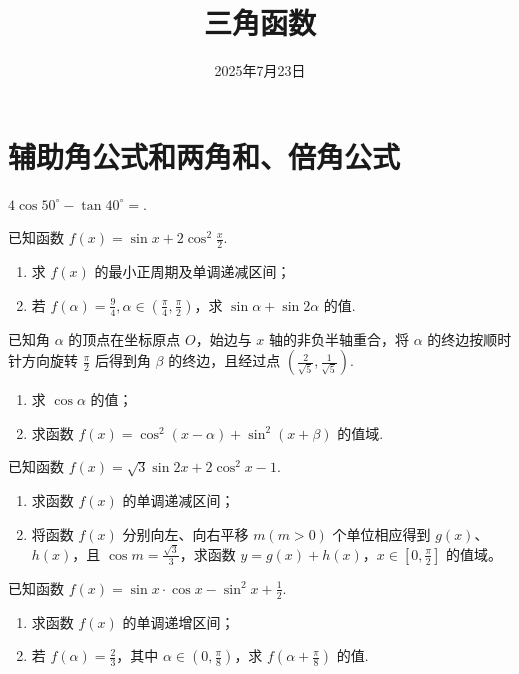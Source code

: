 \documentclass[a4paper , final]{ctexart}
\title{三角函数}
\date{2025年7月23日}
\newenvironment{problem}[1]{%
  \item #1
  \par
  \vspace{8cm}
}{}
\begin{document}
\maketitle

\section*{辅助角公式和两角和、倍角公式}

\begin{problems}
  \begin{problem}
  {
  $4\cos{50^\circ}-\tan{40^\circ}=$\underline{\hspace{1.5cm}}.
  }
  \end{problem}
  \begin{problem}
  {
  已知函数 $f(x) = \sin x +2\cos^2\frac{x}{2}$.
  \begin{enumerate}[label=(\arabic*)]
    \item 求 $f(x)$ 的最小正周期及单调递减区间；
    \item 若 $f(\alpha)=\frac94,\alpha\in(\frac{\pi}{4},\frac{\pi}{2})$，求 $\sin\alpha+\sin 2\alpha$ 的值.
  \end{enumerate}
  }
  \end{problem}

  \begin{problem}
  {
  已知角 $\alpha$ 的顶点在坐标原点 $O$，始边与 $x$ 轴的非负半轴重合，将 $\alpha$ 的终边按顺时针方向旋转 $\frac{\pi}{2}$ 后得到角 $\beta$ 的终边，且经过点 $(\frac{2}{\sqrt{5}}, \frac{1}{\sqrt{5}})$.
  \begin{enumerate}[label=(\arabic*)]
    \item 求 $\cos \alpha$ 的值；
    \item 求函数 $f(x) = \cos^2(x-\alpha) + \sin^2(x+\beta)$ 的值域.
  \end{enumerate}
  }
  \end{problem}

  \begin{problem}
  {
  已知函数 $f(x) = \sqrt{3} \sin 2x + 2\cos^2 x - 1$.
  \begin{enumerate}[label=(\arabic*)]
    \item 求函数 $f(x)$ 的单调递减区间；
    \item 将函数 $f(x)$ 分别向左、向右平移 $m(m>0)$ 个单位相应得到 $g(x)$、$h(x)$，且 $\cos m = \frac{\sqrt{3}}{3}  $，求函数 $y = g(x) + h(x)$，$x \in [0, \frac{\pi}{2}]$ 的值域。
  \end{enumerate}
  }
  \end{problem}
  \newpage
  \begin{problem}
  {
  已知函数 $f(x) = \sin x \cdot \cos x - \sin^2 x + \frac{1}{2}$.
  \begin{enumerate}[label=(\arabic*)]
    \item 求函数 $f(x)$ 的单调递增区间；
    \item 若 $f(\alpha) = \frac{2}{3}$，其中 $\alpha \in \left(0, \frac{\pi}{8}\right)$，求 $f\left(\alpha + \frac{\pi}{8}\right)$ 的值.
  \end{enumerate}
  }
  \end{problem}


\end{problems}
\end{document}
